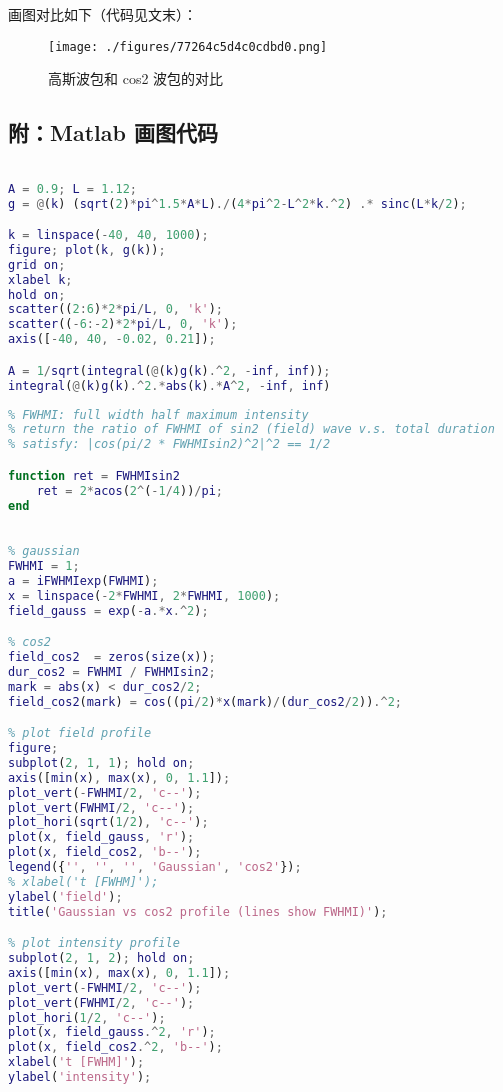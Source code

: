 画图对比如下（代码见文末）：
\begin{figure}[ht]
\centering
\texttt{[image: ./figures/77264c5d4c0cdbd0.png]}
\caption{高斯波包和 cos2 波包的对比} \label{fig_cos2wp_1}
\end{figure}

\subsection{附：Matlab 画图代码}
\begin{lstlisting}[language=matlab, caption=cos2\_spec.m]
% properties of cos2 wave packet spectra

A = 0.9; L = 1.12;
g = @(k) (sqrt(2)*pi^1.5*A*L)./(4*pi^2-L^2*k.^2) .* sinc(L*k/2);

k = linspace(-40, 40, 1000);
figure; plot(k, g(k));
grid on;
xlabel k;
hold on;
scatter((2:6)*2*pi/L, 0, 'k');
scatter((-6:-2)*2*pi/L, 0, 'k');
axis([-40, 40, -0.02, 0.21]);

A = 1/sqrt(integral(@(k)g(k).^2, -inf, inf));
integral(@(k)g(k).^2.*abs(k).*A^2, -inf, inf)
\end{lstlisting}

\begin{lstlisting}[language=matlab,caption=FWHMIsin2]
% FWHMI of wave packets
% FWHMI: full width half maximum intensity
% return the ratio of FWHMI of sin2 (field) wave v.s. total duration
% satisfy: |cos(pi/2 * FWHMIsin2)^2|^2 == 1/2

function ret = FWHMIsin2
    ret = 2*acos(2^(-1/4))/pi;
end
\end{lstlisting}

\begin{lstlisting}[language=matlab, caption=cos2\_gaussian\_compare.m]
% plot Gaussian vs cos2 profile

% gaussian
FWHMI = 1;
a = iFWHMIexp(FWHMI);
x = linspace(-2*FWHMI, 2*FWHMI, 1000);
field_gauss = exp(-a.*x.^2);

% cos2
field_cos2  = zeros(size(x));
dur_cos2 = FWHMI / FWHMIsin2;
mark = abs(x) < dur_cos2/2;
field_cos2(mark) = cos((pi/2)*x(mark)/(dur_cos2/2)).^2;

% plot field profile
figure;
subplot(2, 1, 1); hold on;
axis([min(x), max(x), 0, 1.1]);
plot_vert(-FWHMI/2, 'c--');
plot_vert(FWHMI/2, 'c--');
plot_hori(sqrt(1/2), 'c--');
plot(x, field_gauss, 'r');
plot(x, field_cos2, 'b--');
legend({'', '', '', 'Gaussian', 'cos2'});
% xlabel('t [FWHM]');
ylabel('field');
title('Gaussian vs cos2 profile (lines show FWHMI)');

% plot intensity profile
subplot(2, 1, 2); hold on;
axis([min(x), max(x), 0, 1.1]);
plot_vert(-FWHMI/2, 'c--');
plot_vert(FWHMI/2, 'c--');
plot_hori(1/2, 'c--');
plot(x, field_gauss.^2, 'r');
plot(x, field_cos2.^2, 'b--');
xlabel('t [FWHM]');
ylabel('intensity');
\end{lstlisting}

